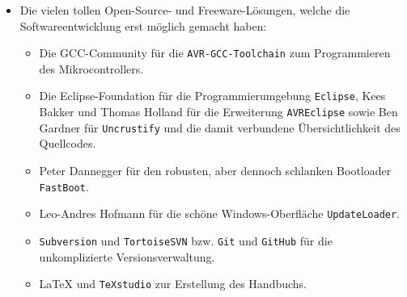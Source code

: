 \documentclass[paper=a4, parskip, numbers=noenddot, toc=listof, headsepline]{scrbook}
\begin{document}
\begin{itemize}
			\item Die vielen tollen Open-Source- und Freeware-Lösungen, welche die Softwareentwicklung erst möglich gemacht haben:
			      \begin{itemize}
				      \item Die GCC-Community für die \texttt{AVR-GCC-Toolchain} zum Programmieren des Mikrocontrollers.
				      \item Die Eclipse-Foundation für die Programmierumgebung \texttt{Eclipse}, Kees Bakker und Thomas Holland für die Erweiterung \texttt{AVREclipse} sowie Ben Gardner für \texttt{Uncrustify} und die damit verbundene Übersichtlichkeit des Quellcodes.
				      \item Peter Dannegger für den robusten, aber dennoch schlanken Bootloader \texttt{FastBoot}.
				      \item Leo-Andres Hofmann für die schöne Windows-Oberfläche \texttt{UpdateLoader}.
				      \item \texttt{Subversion} und \texttt{TortoiseSVN} bzw. \texttt{Git} und \texttt{GitHub} für die unkomplizierte Versionsverwaltung.
				      \item {\LaTeX} und \texttt{TeXstudio} zur Erstellung des Handbuchs.
			      \end{itemize}
		\end{itemize}
\end{document}
